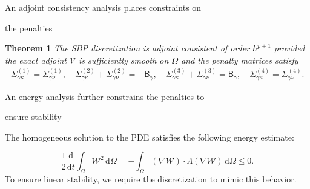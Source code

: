 \documentclass[final]{beamer}
\newlength{\secondcolwid}
\newcommand{\fnc}[1]{\ensuremath{\mathcal{#1}}}
\newcommand{\mat}[1]{\ensuremath{\mathsf{#1}}}
\newcommand{\mr}[1]{\mathrm{#1}}
\newcommand{\diff}[0]{\mr{d}}
\newcommand{\B}[0]{\mat{B}}
\newcommand{\Bg}[0]{\mat{B}_{\gamma}}
\newcommand{\Sig}[0]{\mat{\Sigma}}
\newcommand{\Siggk}[1]{\Sig_{\gamma\kappa}^{(#1)}}
\newcommand{\Siggn}[1]{\Sig_{\gamma\nu}   ^{(#1)}}
\newcommand{\Siggam}[1]{\Sig_{\gamma}^{(#1)}}
\begin{document}
\begin{frame}[t]
\begin{columns}[t]
\begin{column}{\secondcolwid}
\begin{alertblock}{An adjoint consistency analysis places constraints on
        
        the penalties}
\textbf{Theorem 1} \label{thm:adjoint_conditions}
    \textit{
        The SBP discretization is adjoint consistent of order $h^{p+1}$
        provided the exact adjoint $\fnc{V}$ is sufficiently smooth on $\Omega$ and
        the penalty matrices satisfy 
    }
        \begin{equation*} \label{adj_conditions}
        \begin{alignedat}{2}
        \Siggk{1} = \Siggn{1}, \quad  
        \Siggk{2} + \Siggn{2} = -\B_{\gamma}, \quad
        \Siggk{3} + \Siggn{3} = \B_{\gamma}, \quad
        \Siggk{4} = \Siggn{4}.
        \end{alignedat}
        \end{equation*}
\normalfont
\end{alertblock}
\vskip-0.6cm

\begin{alertblock}{An energy analysis further constrains the penalties to 
        
         ensure stability}
    The homogeneous solution to the PDE satisfies the following energy estimate:
    
    \begin{equation*}
    \frac{1}{2} \frac{\diff}{\diff t} \int_{\Omega} \fnc{W}^{2} \, \diff \Omega =
    -\int_{\Omega} \left(\nabla \fnc{W}\right) \cdot \Lambda \left(\nabla
    \fnc{W} \right) \, \diff \Omega \leq 0.
    \end{equation*}
    \normalfont
    To ensure linear stability, we require the discretization to mimic this behavior.  
%    


\end{alertblock}
\end{column}
\end{columns}
\end{frame}
\end{document}
